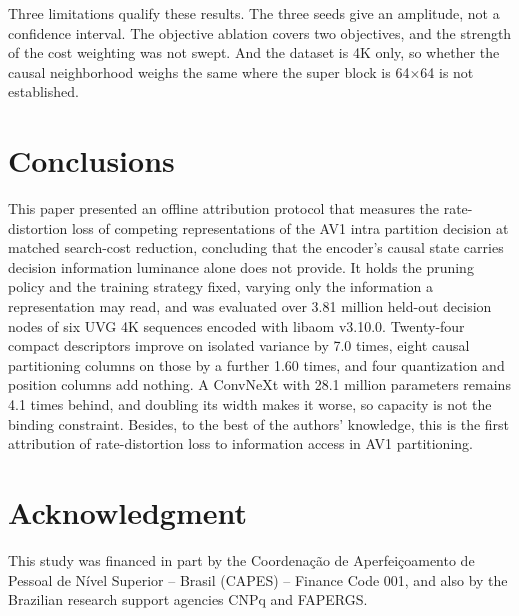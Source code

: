 \documentclass{article}
\begin{document}
Three limitations qualify these results. The three seeds give an amplitude, not
a confidence interval. The objective ablation covers two objectives, and the
strength of the cost weighting was not swept. And the dataset is 4K only, so
whether the causal neighborhood weighs the same where the super block is
64$\times$64 is not established.

\section{Conclusions}
\label{sec:conclusions}

This paper presented an offline attribution protocol that measures the
rate-distortion loss of competing representations of the AV1 intra partition
decision at matched search-cost reduction, concluding that the encoder's causal
state carries decision information luminance alone does not provide. It holds
the pruning policy and the training strategy fixed, varying only the information
a representation may read, and was evaluated over 3.81 million held-out decision
nodes of six UVG 4K sequences encoded with libaom v3.10.0. Twenty-four compact
descriptors improve on isolated variance by 7.0 times, eight causal partitioning
columns on those by a further 1.60 times, and four quantization and position
columns add nothing. A ConvNeXt with 28.1 million parameters remains 4.1 times
behind, and doubling its width makes it worse, so capacity is not the binding
constraint. Besides, to the best of the authors' knowledge, this is the first
attribution of rate-distortion loss to information access in AV1 partitioning.

\section{Acknowledgment}
\label{sec:ack}

This study was financed in part by the Coor\-de\-na\c{c}\~ao de
Aper\-fei\-\c{c}oa\-men\-to de Pes\-so\-al de N\'ivel Su\-pe\-ri\-or -- Brasil
(CAPES) -- Finance Code 001, and also by the Brazilian research support agencies
CNPq and FAPERGS.
\end{document}
